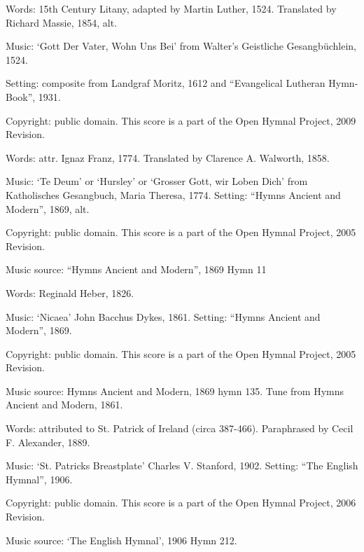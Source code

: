 \begin{multicols}{2}
\par\noindent
Words: 15th Century Litany, adapted by Martin Luther, 1524.  Translated by Richard Massie, 1854, alt. 
\par\noindent
Music: `Gott Der Vater, Wohn Uns Bei' from Walter's Geistliche Gesangbüchlein, 1524.
\par\noindent
Setting: composite from Landgraf Moritz, 1612 and ``Evangelical Lutheran Hymn-Book'', 1931.
\par\noindent
Copyright: public domain. This score is a part of the Open Hymnal Project, 2009 Revision.

\par\noindent
Words: attr. Ignaz Franz, 1774. Translated by Clarence A. Walworth, 1858. 
\par\noindent
Music: `Te Deum' or `Hursley' or `Grosser Gott, wir Loben Dich' from Katholisches Gesangbuch, Maria Theresa, 1774. Setting: ``Hymns Ancient and Modern'', 1869, alt.
\par\noindent
Copyright: public domain. This score is a part of the Open Hymnal Project, 2005 Revision.
\par\noindent
Music source: ``Hymns Ancient and Modern'', 1869 Hymn 11

\par\noindent
Words: Reginald Heber, 1826. 
\par\noindent
Music: `Nicaea' John Bacchus Dykes, 1861.  Setting: ``Hymns Ancient and Modern'', 1869.
\par\noindent
Copyright: public domain. This score is a part of the Open Hymnal Project, 2005 Revision.
\par\noindent
Music source: Hymns Ancient and Modern, 1869 hymn 135.  Tune from Hymns Ancient and Modern, 1861.

\par\noindent
Words: attributed to St. Patrick of Ireland (circa 387-466). Paraphrased by Cecil F. Alexander, 1889. 
\par\noindent
Music: `St. Patricks Breastplate' Charles V. Stanford, 1902.  Setting: ``The English Hymnal'', 1906.
\par\noindent
Copyright: public domain. This score is a part of the Open Hymnal Project, 2006 Revision.
\par\noindent
Music source: `The English Hymnal', 1906 Hymn 212.


\end{multicols}
